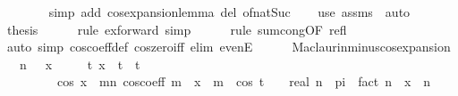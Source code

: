 \begin{isabellebody}
\ \ \ \ \ \ \isamarkupfalse%
\ {\isacharparenleft}{\kern0pt}simp\ add{\isacharcolon}{\kern0pt}\ cos{\isacharunderscore}{\kern0pt}expansion{\isacharunderscore}{\kern0pt}lemma\ del{\isacharcolon}{\kern0pt}\ of{\isacharunderscore}{\kern0pt}nat{\isacharunderscore}{\kern0pt}Suc{\isacharparenright}{\kern0pt}\isanewline
\ \ \isamarkupfalse%
\ {\isacharparenleft}{\kern0pt}use\ assms\ \ auto{\isacharparenright}{\kern0pt}\isanewline
\ \ \isamarkupfalse%
\ \isamarkupfalse%
\ {\isacharquery}{\kern0pt}thesis\isanewline
\ \ \ \ \isamarkupfalse%
\ {\isacharparenleft}{\kern0pt}rule\ ex{\isacharunderscore}{\kern0pt}forward{\isacharcomma}{\kern0pt}\ simp{\isacharparenright}{\kern0pt}\isanewline
\ \ \ \ \isamarkupfalse%
\ {\isacharparenleft}{\kern0pt}rule\ sum{\isachardot}{\kern0pt}cong{\isacharbrackleft}{\kern0pt}OF\ refl{\isacharbrackright}{\kern0pt}{\isacharparenright}{\kern0pt}\isanewline
\ \ \ \ \isamarkupfalse%
\ {\isacharparenleft}{\kern0pt}auto\ simp{\isacharcolon}{\kern0pt}\ cos{\isacharunderscore}{\kern0pt}coeff{\isacharunderscore}{\kern0pt}def\ cos{\isacharunderscore}{\kern0pt}zero{\isacharunderscore}{\kern0pt}iff\ elim{\isacharcolon}{\kern0pt}\ evenE{\isacharparenright}{\kern0pt}\isanewline
\ \ \ \ \isamarkupfalse%
\isanewline
{}\isamarkupfalse%
%
\endisatagproof
{\isafoldproof}%
%
\isadelimproof
\isanewline
%
\endisadelimproof
\isanewline
{}\isamarkupfalse%
\ Maclaurin{\isacharunderscore}{\kern0pt}minus{\isacharunderscore}{\kern0pt}cos{\isacharunderscore}{\kern0pt}expansion{\isacharcolon}{\kern0pt}\isanewline
\ \ \ {\isachardoublequoteopen}n\ {\isachargreater}{\kern0pt}\ {}{\isachardoublequoteclose}\ {\isachardoublequoteopen}x\ {\isacharless}{\kern0pt}\ {}{\isachardoublequoteclose}\isanewline
\ \ \ {\isachardoublequoteopen}{\isasymexists}t{\isachardot}{\kern0pt}\ x\ {\isacharless}{\kern0pt}\ t\ {\isasymand}\ t\ {\isacharless}{\kern0pt}\ {}\ {\isasymand}\isanewline
\ \ \ \ \ \ \ \ \ cos\ x\ {\isacharequal}{\kern0pt}\ {\isacharparenleft}{\kern0pt}{\isasymSum}m{\isacharless}{\kern0pt}n{\isachardot}{\kern0pt}\ cos{\isacharunderscore}{\kern0pt}coeff\ m\ {\isacharasterisk}{\kern0pt}\ x\ {\isacharcircum}{\kern0pt}\ m{\isacharparenright}{\kern0pt}\ {\isacharplus}{\kern0pt}\ {\isacharparenleft}{\kern0pt}{\isacharparenleft}{\kern0pt}cos\ {\isacharparenleft}{\kern0pt}t\ {\isacharplus}{\kern0pt}\ {}{\isacharslash}{\kern0pt}{}\ {\isacharasterisk}{\kern0pt}\ real\ n\ {\isacharasterisk}{\kern0pt}\ pi{\isacharparenright}{\kern0pt}\ {\isacharslash}{\kern0pt}\ fact\ n{\isacharparenright}{\kern0pt}\ {\isacharasterisk}{\kern0pt}\ x\ {\isacharcircum}{\kern0pt}\ n{\isacharparenright}{\kern0pt}{\isachardoublequoteclose}\isanewline

\end{isabellebody}
